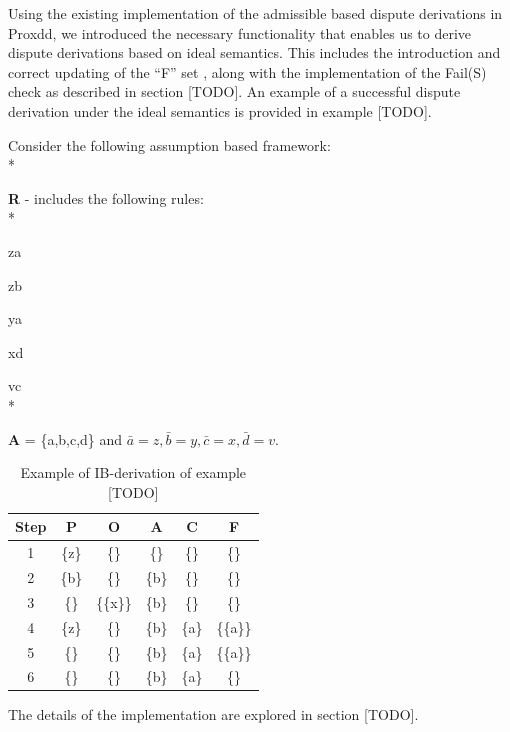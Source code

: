 Using the existing implementation of the admissible based dispute derivations in Proxdd, we introduced the necessary functionality that enables us to derive dispute derivations based on ideal semantics. This includes the introduction and correct updating of the ``F'' set , along with the implementation of the Fail(S) check as described in section [TODO]. An example of a successful dispute derivation under the ideal semantics is provided in example [TODO].

\begin{framed}
\begin{exmp} Consider the following assumption based framework:
\\*

\noindent\textbf{R} - includes the following rules:
\\*

\indent	z\textleftarrow a

\indent z\textleftarrow b

\indent y\textleftarrow a

\indent x\textleftarrow d

\indent v\textleftarrow c
\\*

\noindent\textbf{A} = \{a,b,c,d\} and $\bar{a} = z, \bar{b} = y, \bar{c} = x, \bar{d} = v$.

\end{exmp}
\end{framed}

\clearpage

\begin{table}[h]
  \begin{center}
    \begin{tabular}{cccccc}
    \hline
    Step & P     & O         & A     & C     & F         \\ \hline
    1    & \{z\} & \{\}      & \{\}  & \{\}  & \{\}      \\
    2    & \{b\} & \{\}      & \{b\} & \{\}  & \{\}      \\
    3    & \{\}  & \{\{x\}\} & \{b\} & \{\}  & \{\}      \\
    4    & \{z\} & \{\}      & \{b\} & \{a\} & \{\{a\}\} \\
    5    & \{\}  & \{\}      & \{b\} & \{a\} & \{\{a\}\} \\
    6    & \{\}  & \{\}      & \{b\} & \{a\} & \{\}      \\ \hline
    \end{tabular}
    \caption {Example of IB-derivation of example [TODO]}
  \end{center}
\end{table}

The details of the implementation are explored in section [TODO].